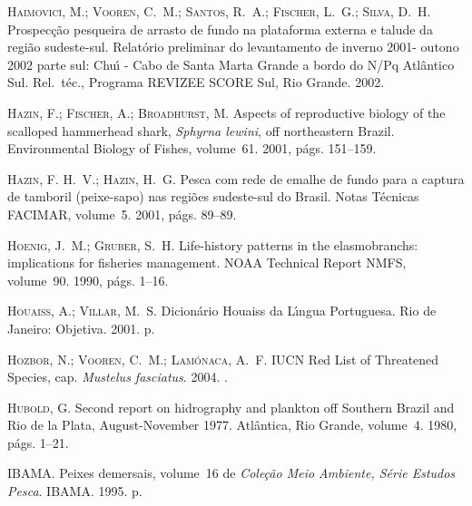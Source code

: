 \documentclass[a4paper,11pt,twoside,showtrims,onecolumn,openright,final]{memoir}
\begin{document}
\begin{thebibliography}{194}
\textsc{Haimovici, M.; Vooren, C.~M.; Santos, R.~A.; Fischer, L.~G.; Silva,
  D.~H.}
\newblock Prospec\c{c}\~ao pesqueira de arrasto de fundo na plataforma externa
  e talude da regi\~ao sudeste-sul. {R}elat\'orio preliminar do levantamento de
  inverno 2001- outono 2002 parte sul: {C}hu\'{\i} - {C}abo de {S}anta {M}arta
  {G}rande a bordo do {N}/{P}q {A}tl\^antico {S}ul.
\newblock Rel.\ t\'ec., Programa REVIZEE SCORE Sul, Rio Grande. 2002.

\textsc{Hazin, F.; Fischer, A.; Broadhurst, M.}
\newblock Aspects of reproductive biology of the scalloped hammerhead shark,
  \emph{{S}phyrna lewini}, off northeastern {B}razil.
\newblock Environmental Biology of Fishes, volume~61. 2001, p\'ags. 151--159.

\textsc{Hazin, F. H.~V.; Hazin, H.~G.}
\newblock Pesca com rede de emalhe de fundo para a captura de tamboril
  (peixe-sapo) nas regi\~oes sudeste-sul do {B}rasil.
\newblock Notas T\'ecnicas FACIMAR, volume~5. 2001, p\'ags. 89--89.

\textsc{Hoenig, J.~M.; Gruber, S.~H.}
\newblock Life-history patterns in the elasmobranchs: implications for
  fisheries management.
\newblock NOAA Technical Report NMFS, volume~90. 1990, p\'ags. 1--16.

\textsc{Houaiss, A.; Villar, M.~S.}
\newblock Dicion\'ario {H}ouaiss da {L}\'{\i}ngua {P}ortuguesa.
\newblock Rio de Janeiro: Objetiva. 2001.
 p.

\textsc{Hozbor, N.; Vooren, C.~M.; Lam\'onaca, A.~F.}
 {IUCN} {R}ed {L}ist of {T}hreatened {S}pecies, cap. \emph{Mustelus
  fasciatus}. 2004.
.

\textsc{Hubold, G.}
\newblock Second report on hidrography and plankton off {S}outhern {B}razil and
  {R}io de la {P}lata, {A}ugust-{N}ovember 1977.
\newblock Atl\^antica, Rio Grande, volume~4. 1980, p\'ags. 1--21.

\textsc{IBAMA}.
\newblock Peixes demersais, volume~16 de \emph{Cole\c{c}\~ao Meio Ambiente,
  S\'erie Estudos Pesca}.
\newblock IBAMA. 1995.
 p.


\end{thebibliography}
\end{document}
